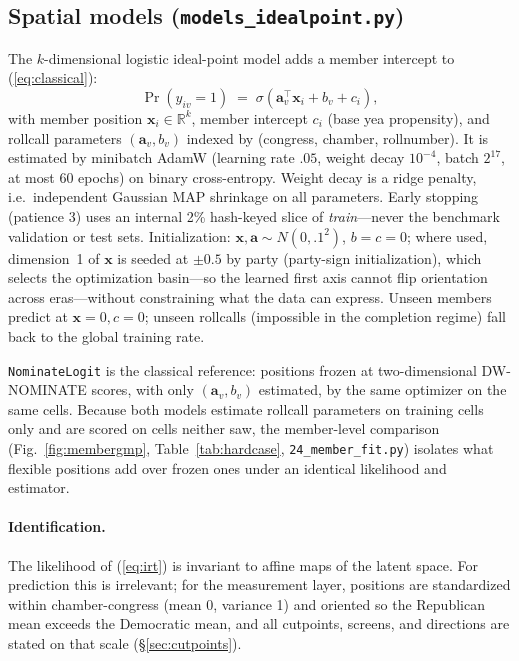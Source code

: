 \documentclass[11pt]{article}
\newcommand{\code}[1]{\texttt{#1}}
\begin{document}
\subsection{Spatial models (\code{models\_idealpoint.py})}
\label{sec:idealpoint}

The $k$-dimensional logistic ideal-point model adds a member intercept
to (\ref{eq:classical}):
\begin{equation}
\Pr(y_{iv} = 1) \;=\; \sigma\!\left(\mathbf{a}_v^\top \mathbf{x}_i
+ b_v + c_i\right),
\label{eq:irt}
\end{equation}
with member position $\mathbf{x}_i \in \mathbb{R}^k$, member intercept
$c_i$ (base yea propensity), and rollcall parameters
$(\mathbf{a}_v, b_v)$ indexed by (congress, chamber, rollnumber). It is
estimated by minibatch AdamW (learning rate $.05$, weight decay
$10^{-4}$, batch $2^{17}$, at most 60 epochs) on binary cross-entropy.
Weight decay is a ridge penalty, i.e.\ independent Gaussian MAP
shrinkage on all parameters. Early stopping (patience 3) uses an
internal 2\% hash-keyed slice of \emph{train}---never the benchmark
validation or test sets. Initialization:
$\mathbf{x}, \mathbf{a} \sim N(0, .1^2)$, $b = c = 0$; where used,
dimension~1 of $\mathbf{x}$ is seeded at $\pm 0.5$ by party
(party-sign initialization), which selects the optimization basin---so
the learned first axis cannot flip orientation across eras---without
constraining what the data can express. Unseen members predict at
$\mathbf{x} = 0, c = 0$; unseen rollcalls (impossible in the completion
regime) fall back to the global training rate.

\code{NominateLogit} is the classical reference: positions frozen at
two-dimensional DW-NOMINATE scores, with only $(\mathbf{a}_v, b_v)$
estimated, by the same optimizer on the same cells. Because both models
estimate rollcall parameters on training cells only and are scored on
cells neither saw, the member-level comparison
(Fig.~\ref{fig:membergmp}, Table~\ref{tab:hardcase},
\code{24\_member\_fit.py}) isolates what flexible positions add over
frozen ones under an identical likelihood and estimator.

\paragraph{Identification.} The likelihood of (\ref{eq:irt}) is
invariant to affine maps of the latent space. For prediction this is
irrelevant; for the measurement layer, positions are standardized
within chamber-congress (mean 0, variance 1) and oriented so the
Republican mean exceeds the Democratic mean, and all cutpoints,
screens, and directions are stated on that scale
(\S\ref{sec:cutpoints}).
\end{document}
